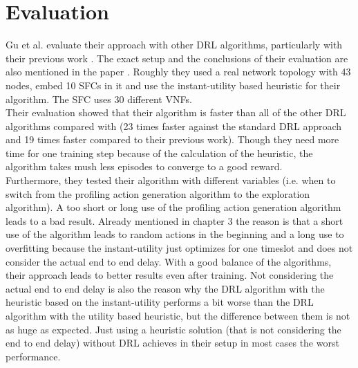 \section{Evaluation}%
\label{sec:evaluation}
Gu et al. \cite{Gu} evaluate their approach with other DRL algorithms, particularly with their previous work \cite{Guz}. The exact setup and the conclusions of their evaluation are also mentioned in the paper \cite{Gu}. Roughly they used a real network topology with 43 nodes, embed 10 SFCs in it and use the instant-utility based heuristic for their algorithm. The SFC uses 30 different VNFs.\\
Their evaluation showed that their algorithm is faster than all of the other DRL algorithms compared with (23 times faster against the standard DRL approach and 19 times faster compared to their previous work). Though they need more time for one training step because of the calculation of the heuristic, the algorithm takes mush less episodes to converge to a good reward.\\
Furthermore, they tested their algorithm with different variables (i.e. when to switch from the profiling action generation algorithm to the exploration algorithm). A too short or long use of the profiling action generation algorithm leads to a bad result. Already mentioned in chapter 3 %
the reason is that a short use of the algorithm leads to random actions in the beginning and a long use to overfitting because the instant-utility just optimizes for one timeslot and does not consider the actual end to end delay. With a good balance of the algorithms, their approach leads to better results even after training. Not considering the actual end to end delay is also the reason why the DRL algorithm with the heuristic based on the instant-utility performs a bit worse than the DRL algorithm with the utility based heuristic, but the difference between them is not as huge as expected. Just using a heuristic solution (that is not considering the end to end delay) without DRL achieves in their setup in most cases the worst performance.




